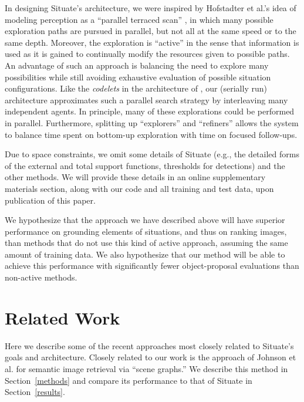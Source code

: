 \documentclass[conference]{IEEEtran}
\begin{document}
In designing Situate's architecture, we were inspired by Hofstadter et
al.'s idea of modeling perception as a ``parallel terraced scan''
\cite{Hofstadter1994}, in which many possible exploration paths are
pursued in parallel, but not all at the same speed or to the same
depth.  Moreover, the exploration is ``active'' in the sense that
information is used as it is gained to continually modify the
resources given to possible paths.  An advantage of such an approach
is balancing the need to explore many possibilities while still
avoiding exhaustive evaluation of possible situation configurations.
Like the {\it codelets} in the architecture of \cite{Hofstadter1994},
our (serially run) architecture approximates such a parallel search
strategy by interleaving many independent agents.  In principle, many
of these explorations could be performed in parallel.  Furthermore,
splitting up ``explorers'' and ``refiners'' allows the system to
balance time spent on bottom-up exploration with time on focused
follow-ups.

Due to space constraints, we omit some details of Situate (e.g., the
detailed forms of the external and total support functions, thresholds
for detections) and the other methods.  We will provide these details
in an online supplementary materials section, along with our code and
all training and test data, upon publication of this paper.

We hypothesize that the approach we have described above will have
superior performance on grounding elements of situations, and thus on
ranking images, than methods that do not use this kind of active
approach, assuming the same amount of training data.  We also
hypothesize that our method will be able to achieve this performance
with significantly fewer object-proposal evaluations than non-active
methods.


\section{Related Work}

Here we describe some of the recent approaches most closely related to
Situate's goals and architecture. Closely related to our work is the
approach of Johnson et al. \cite{Johnson2015a} for semantic image
retrieval via ``scene graphs.''  We describe this method in Section~\ref{methods} and compare its performance to that of Situate in Section~\ref{results}. 
\end{document}

